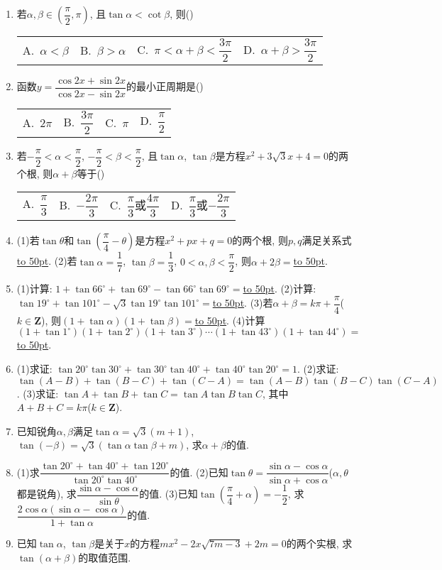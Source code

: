 \documentclass[10pt,a4paper]{article}
\newcommand{\blank}[1]{\underline{\hbox to #1pt{}}}
\newcommand{\fourch}[4]{\par\begin{tabular}{p{.23\textwidth}p{.23\textwidth}p{.23\textwidth}p{.23\textwidth}}
A.~#1 &B.~#2& C.~#3& D.~#4
\end{tabular}}
\begin{document}
\begin{enumerate}[1.]
(5)若$\tan (\alpha +\dfrac{\pi}4)=-\dfrac 9{40}$, 则$\tan \alpha =$\blank{50}, $\tan (\alpha -\dfrac{\pi}4)=$\blank{50}.
\item 若$\alpha ,\beta \in (\dfrac{\pi}2,\pi)$, 且$\tan \alpha <\cot \beta$, 则()
\fourch{$\alpha <\beta$}{$\beta >\alpha$}{$\pi <\alpha +\beta <\dfrac{3\pi}2$}{$\alpha +\beta >\dfrac{3\pi}2$}
\item 函数$y=\dfrac{\cos 2x+\sin 2x}{\cos 2x-\sin 2x}$的最小正周期是()
\fourch{$2\pi$}{$\dfrac{3\pi}2$}{$\pi$}{$\dfrac{\pi}2$}
\item 若$-\dfrac{\pi}2<\alpha <\dfrac{\pi}2$, $-\dfrac{\pi}2<\beta <\dfrac{\pi}2$, 且$\tan \alpha$, $\tan \beta$是方程$x^2+3\sqrt 3x+4=0$的两个根, 则$\alpha +\beta$等于()
\fourch{$\dfrac{\pi}3$}{$-\dfrac{2\pi}3$}{$\dfrac{\pi}3$或$\dfrac{4\pi}3$}{$\dfrac{\pi}3$或$-\dfrac{2\pi}3$}
\item (1)若$\tan \theta$和$\tan (\dfrac{\pi}4-\theta)$是方程$x^2+px+q=0$的两个根, 则$p,q$满足关系式\blank{50}.
(2)若$\tan \alpha =\dfrac 17$, $\tan \beta =\dfrac 13$, $0<\alpha ,\beta <\dfrac{\pi}2$, 则$\alpha +2\beta =$\blank{50}.
\item (1)计算: $1+\tan 66^\circ +\tan 69^\circ -\tan 66^\circ \tan 69^\circ =$\blank{50}.
(2)计算: $\tan 19^\circ +\tan 101^\circ -\sqrt 3\tan 19^\circ \tan 101^\circ =$\blank{50}.
(3)若$\alpha +\beta =k\pi +\dfrac{\pi}4$($k\in \mathbf{Z}$), 则$(1+\tan \alpha)(1+\tan \beta)=$\blank{50}.
(4)计算$(1+\tan 1^\circ)(1+\tan 2^\circ)(1+\tan 3^\circ)\cdots (1+\tan 43^\circ)(1+\tan 44^\circ)=$\blank{50}.
\item (1)求证: $\tan 20^\circ \tan 30^\circ +\tan 30^\circ \tan 40^\circ +\tan 40^\circ \tan 20^\circ =1$.
(2)求证: $\tan (A-B)+\tan (B-C)+\tan (C-A)=\tan (A-B)\tan (B-C)\tan (C-A)$.
(3)求证: $\tan A+\tan B+\tan C=\tan A\tan B\tan C$, 其中$A+B+C=k\pi$($k\in \mathbf{Z}$).
\item 已知锐角$\alpha ,\beta$满足$\tan \alpha =\sqrt 3(m+1)$, $\tan (-\beta)=\sqrt 3(\tan \alpha \tan \beta +m)$, 求$\alpha +\beta$的值.
\item (1)求$\dfrac{\tan 20^\circ +\tan 40^\circ +\tan 120^\circ}{\tan 20^\circ \tan 40^\circ}$的值.
(2)已知$\tan \theta =\dfrac{\sin \alpha -\cos \alpha}{\sin \alpha +\cos \alpha}$($\alpha ,\theta$都是锐角), 求$\dfrac{\sin \alpha -\cos \alpha}{\sin \theta}$的值.
(3)已知$\tan (\dfrac{\pi}4+\alpha)=-\dfrac 12$, 求$\dfrac{2\cos \alpha (\sin \alpha -\cos \alpha)}{1+\tan \alpha}$的值.
\item 已知$\tan \alpha$, $\tan \beta$是关于$x$的方程$mx^2-2x\sqrt {7m-3}+2m=0$的两个实根, 求$\tan (\alpha +\beta)$的取值范围.

\end{enumerate}
\end{document}
